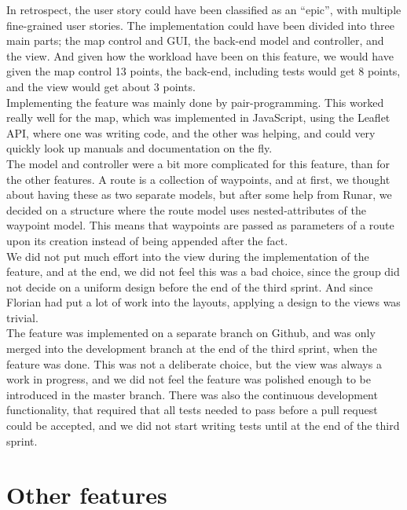 \documentclass[a4paper]{article}
\begin{document}
\noindent
In retrospect, the user story could have been classified as an “epic”, with multiple fine-grained user stories. The implementation could have been divided into three main parts; the map control and GUI, the back-end model and controller, and the view. And given how the workload have been on this feature, we would have given the map control 13 points, the back-end, including tests would get 8 points, and the view would get about 3 points. \\

\noindent
Implementing the feature was mainly done by pair-programming. This worked really well for the map, which was implemented in JavaScript, using the Leaflet API, where one was writing code, and the other was helping, and could very quickly look up manuals and documentation on the fly. \\

\noindent
The model and controller were a bit more complicated for this feature, than for the other features. A route is a collection of waypoints, and at first, we thought about having these as two separate models, but after some help from Runar, we decided on a structure where the route model uses nested-attributes of the waypoint model. This means that waypoints are passed as parameters of a route upon its creation instead of being appended after the fact. \\

\noindent
We did not put much effort into the view during the implementation of the feature, and at the end, we did not feel this was a bad choice, since the group did not decide on a uniform design before the end of the third sprint. And since Florian had put a lot of work into the layouts, applying a design to the views was trivial. \\

\noindent
The feature was implemented on a separate branch on Github, and was only merged into the development branch at the end of the third sprint, when the feature was done. This was not a deliberate choice, but the view was always a work in progress, and we did not feel the feature was polished enough to be introduced in the master branch. There was also the continuous development functionality, that required that all tests needed to pass before a pull request could be accepted, and we did not start writing tests until at the end of the third sprint. \\

\section{Other features}
\end{document}
